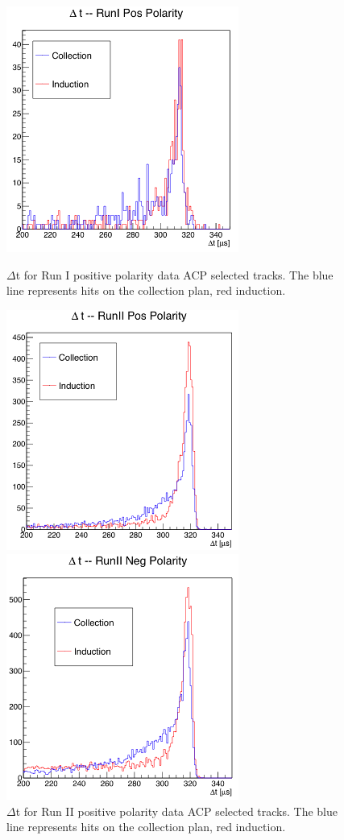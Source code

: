 \begin{figure}[]
\centering
\begin{minipage}{0.45\textwidth}
\centering
\includegraphics[width=3in]{images/ACPRunIPos.png}
\caption{$\Delta$t for Run I positive polarity data ACP selected tracks. The blue line represents hits on the collection plan, red induction.}
\label{fig:RunIPosACP}
\end{minipage}\hfill
\begin{minipage}{0.45\textwidth}
\centering
\includegraphics[width=3in]{images/ACPRunIIPos.png}
\caption{$\Delta$t for Run II positive polarity data ACP selected tracks.  The blue line represents hits on the collection plan, red induction.}
\label{fig:RunIIPosACP}
\end{minipage}\hfill
\begin{minipage}{0.45\textwidth}
\centering
\includegraphics[width=3in]{images/ACPRunIINeg.png}

\end{minipage}
\end{figure}
